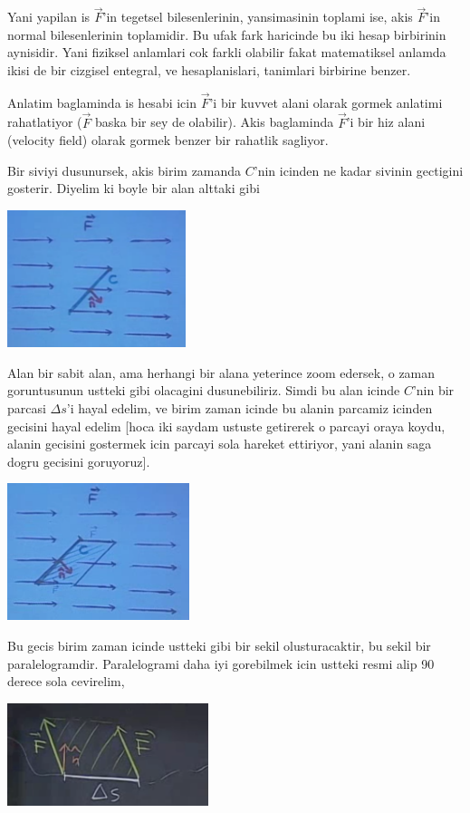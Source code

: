 \documentclass[12pt,fleqn]{article}
\begin{document}
Yani yapilan is $\vec{F}$'in tegetsel bilesenlerinin, yansimasinin toplami
ise, akis $\vec{F}$'in normal bilesenlerinin toplamidir. Bu ufak fark
haricinde bu iki hesap birbirinin aynisidir. Yani fiziksel anlamlari cok
farkli olabilir fakat matematiksel anlamda ikisi de bir cizgisel entegral,
ve hesaplanislari, tanimlari birbirine benzer. 

Anlatim baglaminda is hesabi icin $\vec{F}$'i bir kuvvet alani olarak gormek
anlatimi rahatlatiyor ($\vec{F}$ baska bir sey de olabilir). Akis
baglaminda $\vec{F}$'i bir hiz alani (velocity field) olarak gormek
benzer bir rahatlik sagliyor. 

Bir siviyi dusunursek, akis birim zamanda $C$'nin icinden ne kadar sivinin
gectigini gosterir. Diyelim ki boyle bir alan alttaki gibi

\includegraphics[height=4cm]{23_3.png}

Alan bir sabit alan, ama herhangi bir alana yeterince zoom edersek, o zaman
goruntusunun ustteki gibi olacagini dusunebiliriz. Simdi bu alan icinde
$C$'nin bir parcasi $\Delta s$'i hayal edelim, ve birim zaman icinde bu
alanin parcamiz icinden gecisini hayal edelim [hoca iki saydam ustuste
getirerek o parcayi oraya koydu, alanin gecisini gostermek icin parcayi
sola hareket ettiriyor, yani alanin saga dogru gecisini goruyoruz].

\includegraphics[height=4cm]{23_4.png}

Bu gecis birim zaman icinde ustteki gibi bir sekil olusturacaktir, bu
sekil bir paralelogramdir. Paralelogrami daha iyi gorebilmek icin ustteki
resmi alip 90 derece sola cevirelim, 

\includegraphics[height=3cm]{23_5.png}
\end{document}
